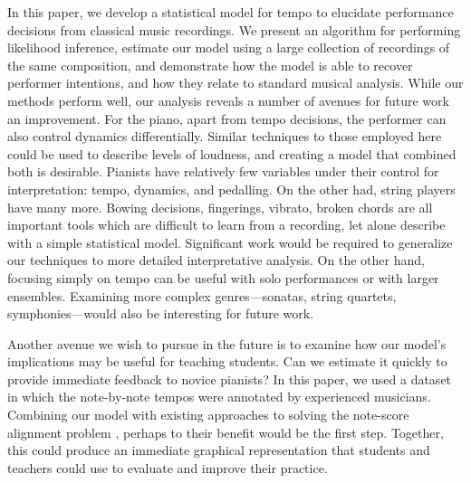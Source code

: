 \documentclass[aoas]{imsart}
\begin{document}
In this paper, we develop a statistical model for tempo to elucidate performance
decisions from classical music recordings. We present an algorithm for
performing likelihood inference, estimate our model using a large
collection of recordings of the same composition, and demonstrate how
the model is able to recover performer intentions, and how they relate
to standard musical analysis. While our methods perform well, our
analysis reveals a number of avenues for future work an
improvement. For the piano, apart from tempo decisions, the performer
can also control dynamics differentially. Similar techniques to those
employed here could be used to describe levels of loudness, and
creating a model that combined both is desirable. Pianists have
relatively few variables under their control for interpretation:
tempo, dynamics, and pedalling. On the other had, string players have
many more. Bowing decisions, fingerings, vibrato, broken chords are
all important tools which are difficult to learn from a recording, let
alone describe with a simple statistical model. Significant work would
be required to generalize our techniques to more detailed
interpretative analysis. On the other hand, focusing simply on tempo
can be useful with solo performances or with larger
ensembles. Examining more complex genres---sonatas, string quartets,
symphonies---would also be interesting for future work.

Another avenue we wish to pursue in the future is to examine how our
model's implications may be useful for teaching students. Can we
estimate it quickly to provide immediate feedback to novice pianists?
In this paper, we used a dataset in which the note-by-note tempos were
annotated by experienced musicians. Combining our model with existing
approaches to solving the note-score alignment problem
\citep{LangFreitas2005,Raphael2002,DannenbergRaphael2006}, perhaps to
their benefit would be the first step. Together, this could produce an
immediate graphical representation that students and teachers could
use to evaluate and improve their practice.


\begin{supplement}


  \label{supp}

\end{supplement}


\clearpage





\end{document}
